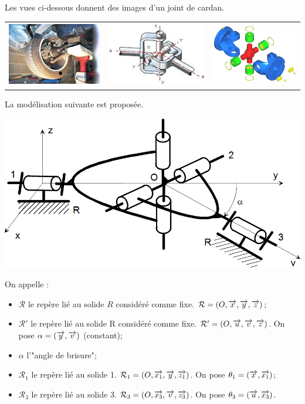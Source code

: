 \documentclass[11pt,oneside]{article}
\begin{document}
Les vues ci-dessous donnent des images d’un joint de cardan.

\begin{center}
\begin{tabular}{ccc}
\includegraphics[width=.3\textwidth]{png/fig3_1} & 
\includegraphics[width=.3\textwidth]{png/fig3_2} & 
\includegraphics[width=.3\textwidth]{png/fig3_3} 
\end{tabular}
\end{center}

La modélisation suivante est proposée.
\begin{center}
\includegraphics[width=.7\textwidth]{png/fig3_4} 
\end{center}

On appelle : 
\begin{itemize}
\item $\mathcal{R}$ le repère lié au solide $R$ considéré comme fixe. $\mathcal{R}=\left(O,\overrightarrow{x},\overrightarrow{y},\overrightarrow{z} \right)$;
\item $\mathcal{R}'$ le repère lié au solide R considéré comme fixe. $\mathcal{R}'=\left(O,\overrightarrow{u},\overrightarrow{v},\overrightarrow{z} \right)$. On pose $\alpha = \left(\overrightarrow{y},\overrightarrow{v} \right)$ (constant);
\item $\alpha$ l'"angle de brisure";
\item $\mathcal{R}_1$ le repère lié au solide 1. $\mathcal{R}_1 = \left(O,\overrightarrow{x_1},\overrightarrow{y},\overrightarrow{z_1} \right)$. On pose  $\theta_1 = \left(\overrightarrow{x},\overrightarrow{x_1} \right)$;
\item $\mathcal{R}_3$ le repère lié au solide 3. $\mathcal{R}_3 = \left(O,\overrightarrow{x_3},\overrightarrow{v},\overrightarrow{z_3} \right)$. On pose $\theta_3 = \left(\overrightarrow{u},\overrightarrow{x_3} \right)$.
\end{itemize}
\end{document}
